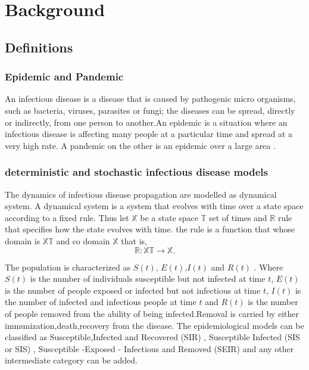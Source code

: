 \chapter{Background}

\section{Definitions}
\subsection{Epidemic and Pandemic }
An infectious disease is a disease that is caused by pathogenic micro organisms, such as bacteria, viruses, parasites or fungi; the diseases can be spread, directly or indirectly, from one person to another.An  epidemic is a situation where an infectious disease is affecting many people at a particular time and spread at a very high rate. A pandemic on the other is an epidemic over a large area \citep{morens2009pandemic}.

\subsection{deterministic and stochastic infectious disease models}
The dynamics of infectious disease propagation are modelled as dynamical system. A dynamical system is a system that evolves with time over a state space according to a fixed rule. Thus let $\mathbb{X}$ be a state space $\mathbb{T}$ set of times and $\mathbb{R}$ rule that specifies how the state evolves with time. the rule is a function that whose domain is $\mathbb{X} \mathbb{T}$ and co domain $\mathbb{X}$ that is,
\begin{equation*}
\mathbb{R}: \mathbb{X} \mathbb{T} \longrightarrow \mathbb{X}.
\end{equation*}


The population is characterized as $S(t)$, $E(t)$,$I(t)$ and $R(t)$ . Where $S(t)$ is the number of individuals susceptible but not infected at time $t$, $E(t)$ is the number of people exposed or infected but not infectious at time $t$, $I(t)$ is the number of infected and infectious people at time $t$ and $R(t)$ is the number of people removed from the ability of being infected.Removal is carried by either immunization,death,recovery from the disease. The epidemiological models can be classified as Susceptible,Infected and Recovered (SIR) , Susceptible Infected (SIS or SIS) , Susceptible -Exposed - Infectious and Removed (SEIR)  and any other intermediate category can be added.

